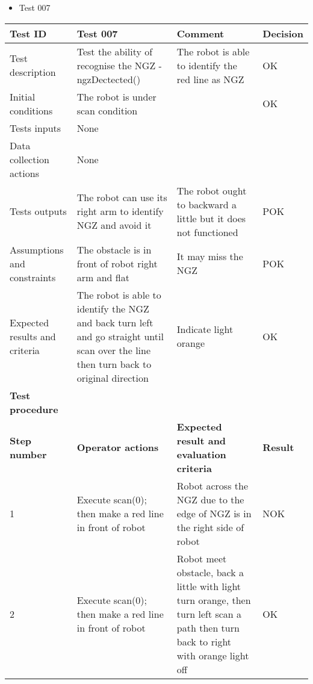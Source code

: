 \documentclass[11pt, a4paper]{article}
\begin{document}
\begin{itemize}
\item {Test 007}\\
\end{itemize}

\begin{tabular} 
	  {|p{4cm}|p{4.5cm}|p{4.5cm}|p{1.5cm}|}
\hline
\textbf{Test ID} & \textbf{Test 007} & \textbf{Comment} & \textbf{Decision}\\
\hline
{Test description} & {Test the ability of recognise the NGZ - ngzDectected()} & {The robot is able to identify the red line as NGZ} & {OK}\\
\hline
{Initial conditions} & {The robot is under scan \newline condition} & {} & {OK}\\
\hline
{Tests inputs} & {None} & {} & {}\\
\hline
{Data collection actions} & {None} & {} & {}\\
\hline
{Tests outputs} & {The robot can use its right arm to identify NGZ and avoid it} & {The robot ought to backward a little but it does not functioned} & {POK}\\
\hline
{Assumptions and constraints} & {The obstacle is in front of robot right arm and flat} & {It may miss the NGZ} & {POK}\\
\hline
{Expected results and criteria} & {The robot is able to identify the NGZ and back turn left and go straight until scan over the line then turn back to original \newline direction} & {Indicate light orange} & {OK}\\
\hline
\textbf{Test procedure} & \textbf{} & \textbf{} & \textbf{}\\
\hline
\textbf{Step number} & \textbf{Operator actions} & \textbf{Expected result and \newline evaluation criteria} & \textbf{Result}\\
\hline
{1} & {Execute \newline scan(0); \newline then make a red line in front of robot} & {Robot across the NGZ due to the edge of NGZ is in the right side of robot} & {NOK}\\
\hline
{2} & {Execute \newline scan(0); \newline then make a red line in front of robot} & {Robot meet obstacle, back a \newline little with light turn orange, then turn left scan a path then turn back to right with orange light off} & {OK}\\
\hline
\end{tabular}
\newpage
\end{document}
